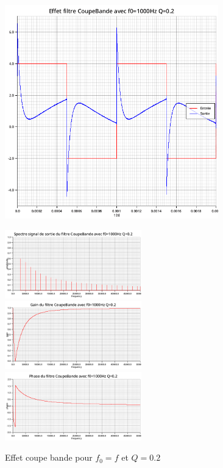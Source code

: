 \documentclass{article}
\begin{document}
\begin{figure}[H]
  \begin{minipage}{0.6\textwidth}
      \centering
      \includegraphics[width=25em]{images/creneau/rejecteur/q=0.2/1/signals.png}
  \end{minipage}
  \begin{minipage}{0.3\textwidth}
      \centering
      \includegraphics[width=16em]{images/creneau/rejecteur/q=0.2/1/fft_out.png}
      \vfill
      \includegraphics[width=16em]{images/creneau/rejecteur/q=0.2/1/gain.png}
      \vfill
      \includegraphics[width=16em]{images/creneau/rejecteur/q=0.2/1/phase.png}
  \end{minipage}
  \caption{Effet coupe bande pour $f_0=f$ et $Q=0.2$}
\end{figure}
\end{document}
